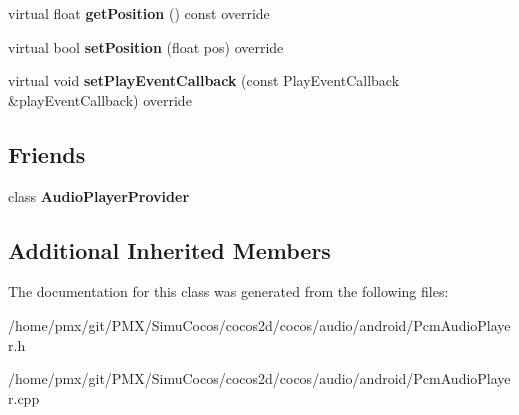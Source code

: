 \begin{DoxyCompactItemize}
virtual float {\bfseries get\+Position} () const override
\item 
\mbox{\label{classcocos2d_1_1experimental_1_1PcmAudioPlayer_a6049b80f5accfb7af5609bebaf2e587b}} 
virtual bool {\bfseries set\+Position} (float pos) override
\item 
\mbox{\label{classcocos2d_1_1experimental_1_1PcmAudioPlayer_a7849831336370b91d5fcd5baff682744}} 
virtual void {\bfseries set\+Play\+Event\+Callback} (const Play\+Event\+Callback \&play\+Event\+Callback) override
\end{DoxyCompactItemize}
\subsection*{Friends}
\begin{DoxyCompactItemize}
\item 
\mbox{\label{classcocos2d_1_1experimental_1_1PcmAudioPlayer_a0843db55a3a12f76fc06297731df3ac3}} 
class {\bfseries Audio\+Player\+Provider}
\end{DoxyCompactItemize}
\subsection*{Additional Inherited Members}


The documentation for this class was generated from the following files\+:\begin{DoxyCompactItemize}
\item 
/home/pmx/git/\+P\+M\+X/\+Simu\+Cocos/cocos2d/cocos/audio/android/Pcm\+Audio\+Player.\+h\item 
/home/pmx/git/\+P\+M\+X/\+Simu\+Cocos/cocos2d/cocos/audio/android/Pcm\+Audio\+Player.\+cpp\end{DoxyCompactItemize}
